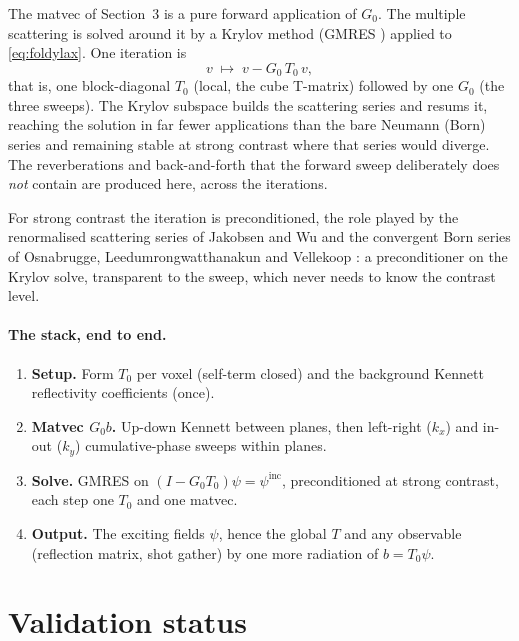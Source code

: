 \documentclass[11pt,a4paper]{article}
\newcommand{\Tz}{T_0}
\newcommand{\Gz}{G_0}
\begin{document}
The matvec of Section~3 is a pure forward application of $\Gz$. The multiple scattering is
solved around it by a Krylov method (GMRES \cite{SaadSchultz1986}) applied to
\eqref{eq:foldylax}. One iteration is
\begin{equation}
v \;\longmapsto\; v-\Gz\,\Tz\,v,
\end{equation}
that is, one block-diagonal $\Tz$ (local, the cube T-matrix) followed by one $\Gz$ (the three
sweeps). The Krylov subspace builds the scattering series and resums it, reaching the solution
in far fewer applications than the bare Neumann (Born) series and remaining stable at strong
contrast where that series would diverge. The reverberations and back-and-forth that the
forward sweep deliberately does \emph{not} contain are produced here, across the iterations.

For strong contrast the iteration is preconditioned, the role played by the renormalised
scattering series of Jakobsen and Wu \cite{JakobsenWu2016} and the convergent Born series of
Osnabrugge, Leedumrongwatthanakun and Vellekoop \cite{Osnabrugge2016}: a preconditioner on the
Krylov solve, transparent to the sweep, which never needs to know the contrast level.

\paragraph{The stack, end to end.}
\begin{enumerate}\setlength{\itemsep}{1pt}
\item \textbf{Setup.} Form $\Tz$ per voxel (self-term closed) and the background Kennett
reflectivity coefficients (once).
\item \textbf{Matvec $\Gz b$.} Up-down Kennett between planes, then left-right ($k_x$) and
in-out ($k_y$) cumulative-phase sweeps within planes.
\item \textbf{Solve.} GMRES on $(I-\Gz\Tz)\psi=\psi^{\mathrm{inc}}$, preconditioned at strong
contrast, each step one $\Tz$ and one matvec.
\item \textbf{Output.} The exciting fields $\psi$, hence the global $T$ and any observable
(reflection matrix, shot gather) by one more radiation of $b=\Tz\psi$.
\end{enumerate}

\section{Validation status}\label{sec:validation}
\end{document}
